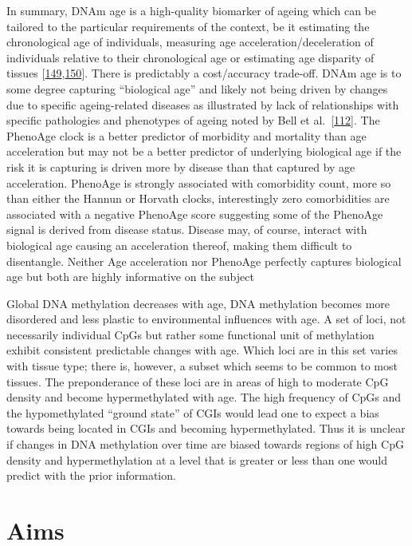 \documentclass[
]{book}
\begin{document}
In summary, DNAm age is a high-quality biomarker of ageing which can be tailored to the particular requirements of the context, be it estimating the chronological age of individuals, measuring age acceleration/deceleration of individuals relative to their chronological age or estimating age disparity of tissues {[}\protect\hyperlink{ref-Horvath2018}{149},\protect\hyperlink{ref-Bell2019}{150}{]}.
There is predictably a cost/accuracy trade-off.
DNAm age is to some degree capturing ``biological age'' and likely not being driven by changes due to specific ageing-related diseases as illustrated by lack of relationships with specific pathologies and phenotypes of ageing noted by Bell et al.~{[}\protect\hyperlink{ref-Bell2012}{112}{]}.
The PhenoAge clock is a better predictor of morbidity and mortality than age acceleration but may not be a better predictor of underlying biological age if the risk it is capturing is driven more by disease than that captured by age acceleration.
PhenoAge is strongly associated with comorbidity count, more so than either the Hannun or Horvath clocks, interestingly zero comorbidities are associated with a negative PhenoAge score suggesting some of the PhenoAge signal is derived from disease status.
Disease may, of course, interact with biological age causing an acceleration thereof, making them difficult to disentangle.
Neither Age acceleration nor PhenoAge perfectly captures biological age but both are highly informative on the subject

Global DNA methylation decreases with age, DNA methylation becomes more disordered and less plastic to environmental influences with age.
A set of loci, not necessarily individual CpGs but rather some functional unit of methylation exhibit consistent predictable changes with age.
Which loci are in this set varies with tissue type; there is, however, a subset which seems to be common to most tissues.
The preponderance of these loci are in areas of high to moderate CpG density and become hypermethylated with age.
The high frequency of CpGs and the hypomethylated ``ground state'' of CGIs would lead one to expect a bias towards being located in CGIs and becoming hypermethylated.
Thus it is unclear if changes in DNA methylation over time are biased towards regions of high CpG density and hypermethylation at a level that is greater or less than one would predict with the prior information.

\hypertarget{aims}{%
\section{Aims}\label{aims}}
\end{document}
